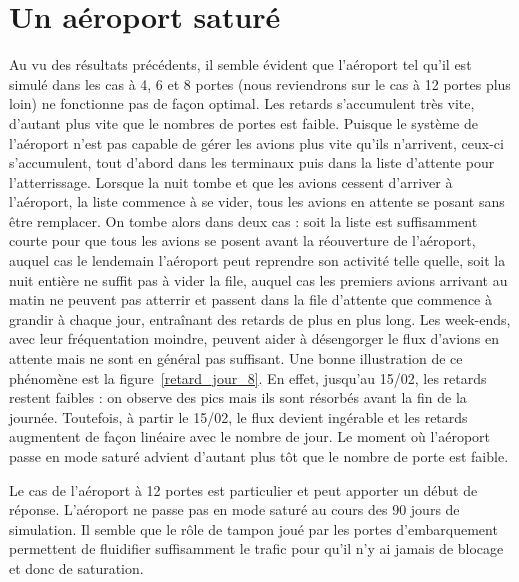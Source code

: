 
\section{Un aéroport saturé}
Au vu des résultats précédents, il semble évident que l'aéroport tel qu'il est simulé dans les cas à 4, 6 et 8 portes (nous reviendrons sur le cas à 12 portes plus loin) ne fonctionne pas de façon optimal.
Les retards s'accumulent très vite, d'autant plus vite que le nombres de portes est faible. Puisque le système de l'aéroport n'est pas capable de gérer les avions plus vite qu'ils n'arrivent, ceux-ci s'accumulent, tout d'abord dans les terminaux puis dans la liste d'attente pour l'atterrissage.
Lorsque la nuit tombe et que les avions cessent d'arriver à l'aéroport, la liste commence à se vider, tous les avions en attente se posant sans être remplacer. On tombe alors dans deux cas : soit la liste est suffisamment courte pour que tous les avions se posent avant la réouverture de l'aéroport, auquel cas le lendemain l'aéroport peut reprendre son activité telle quelle, soit la nuit entière ne suffit pas à vider la file, auquel cas les premiers avions arrivant au matin ne peuvent pas atterrir et passent dans la file d'attente que commence à grandir à chaque jour, entraînant des retards de plus en plus long. Les week-ends, avec leur fréquentation moindre, peuvent aider à désengorger le flux d'avions en attente mais ne sont en général pas suffisant.
Une bonne illustration de ce phénomène est la figure~\ref{retard_jour_8}. En effet, jusqu'au 15/02, les retards restent faibles : on observe des pics mais ils sont résorbés avant la fin de la journée. Toutefois, à partir le 15/02, le flux devient ingérable et les retards augmentent de façon linéaire avec le nombre de jour.
Le moment où l'aéroport passe en mode saturé advient d'autant plus tôt que le nombre de porte est faible.

Le cas de l'aéroport à 12 portes est particulier et peut apporter un début de réponse. L'aéroport ne passe pas en mode saturé au cours des 90 jours de simulation. Il semble que le rôle de tampon joué par les portes d'embarquement permettent de fluidifier suffisamment le trafic pour qu'il n'y ai jamais de blocage et donc de saturation.

